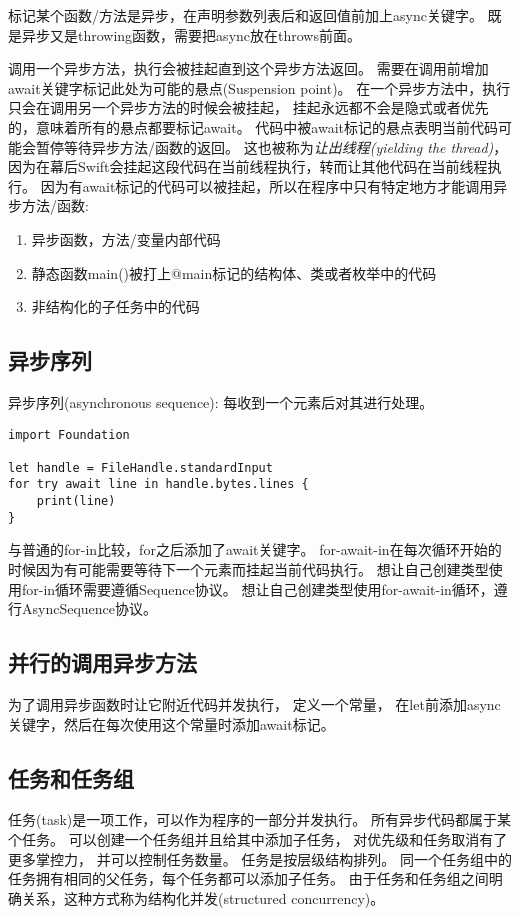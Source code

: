 \documentclass{../main.tex}{subfiles}
\begin{document}
标记某个函数/方法是异步，在声明参数列表后和返回值前加上async关键字。
既是异步又是throwing函数，需要把async放在throws前面。

调用一个异步方法，执行会被挂起直到这个异步方法返回。
需要在调用前增加await关键字标记此处为可能的悬点(Suspension point)。
在一个异步方法中，执行只会在调用另一个异步方法的时候会被挂起，
    挂起永远都不会是隐式或者优先的，意味着所有的悬点都要标记await。
代码中被await标记的悬点表明当前代码可能会暂停等待异步方法/函数的返回。
这也被称为\emph{让出线程(yielding the thread)}，
因为在幕后Swift会挂起这段代码在当前线程执行，转而让其他代码在当前线程执行。
因为有await标记的代码可以被挂起，所以在程序中只有特定地方才能调用异步方法/函数:
\begin{enumerate}[itemsep=0pt, parsep=0pt, topsep=0pt, partopsep=0pt]
    \item 异步函数，方法/变量内部代码
    \item 静态函数main()被打上@main标记的结构体、类或者枚举中的代码
    \item 非结构化的子任务中的代码
\end{enumerate}
\subsection{异步序列}
异步序列(asynchronous sequence): 每收到一个元素后对其进行处理。
\begin{lstlisting}[style = CodeLstStyleSwift, caption = {异步序列}]
import Foundation

let handle = FileHandle.standardInput
for try await line in handle.bytes.lines {
    print(line)
}
\end{lstlisting}
与普通的for-in比较，for之后添加了await关键字。
for-await-in在每次循环开始的时候因为有可能需要等待下一个元素而挂起当前代码执行。
想让自己创建类型使用for-in循环需要遵循Sequence协议。
想让自己创建类型使用for-await-in循环，遵行AsyncSequence协议。

\subsection{并行的调用异步方法}
为了调用异步函数时让它附近代码并发执行，
    定义一个常量，
    在let前添加async关键字，然后在每次使用这个常量时添加await标记。

\subsection{任务和任务组}
任务(task)是一项工作，可以作为程序的一部分并发执行。
所有异步代码都属于某个任务。
可以创建一个任务组并且给其中添加子任务，
    对优先级和任务取消有了更多掌控力，
    并可以控制任务数量。
任务是按层级结构排列。
同一个任务组中的任务拥有相同的父任务，每个任务都可以添加子任务。
由于任务和任务组之间明确关系，这种方式称为结构化并发(structured concurrency)。
\end{document}
